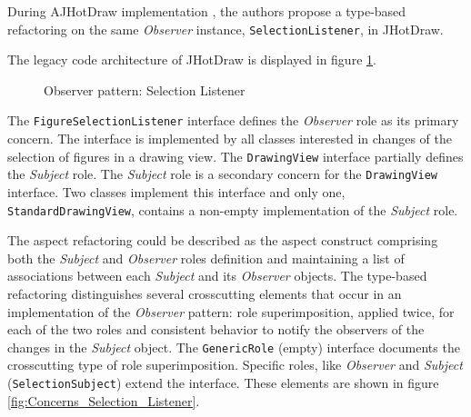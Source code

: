 During AJHotDraw implementation\cite{marin2005approach} \cite{hannemann2005role}, the authors propose a type-based refactoring on the same \textit{Observer} instance, \texttt{SelectionListener}, in JHotDraw. 

The legacy code architecture of JHotDraw is displayed in figure \ref{fig:Selection_Listener}.

\begin{figure}[H]
	\centering
  	\caption{Observer pattern: Selection Listener \cite{marin2005approach}}
  	\label{fig:Selection_Listener}
\end{figure}

The \texttt{FigureSelectionListener} interface defines the \textit{Observer} role as its primary concern. 
The interface is implemented by all classes interested in changes of the selection of figures in a drawing view. 
The \texttt{DrawingView} interface partially defines the \textit{Subject} role. 
The \textit{Subject} role is a secondary concern for the \texttt{DrawingView} interface. 
Two classes implement this interface and only one, \texttt{StandardDrawingView}, contains a non-empty implementation of the \textit{Subject} role.

The aspect refactoring could be described as the aspect construct comprising both the \textit{Subject} and \textit{Observer} roles definition and maintaining a list of associations between each \textit{Subject} and its \textit{Observer} objects.
The type-based refactoring\cite{marin2005approach} distinguishes several crosscutting elements that occur in an implementation of the \textit{Observer} pattern: role superimposition, applied twice, for each of the two roles and consistent behavior to notify the observers of the changes in the \textit{Subject} object.
The \texttt{GenericRole} (empty) interface documents the crosscutting type of role superimposition. 
Specific roles, like \textit{Observer} and \textit{Subject} (\texttt{SelectionSubject}) extend the interface.
These elements are shown in figure \ref{fig:Concerns_Selection_Listener}.

